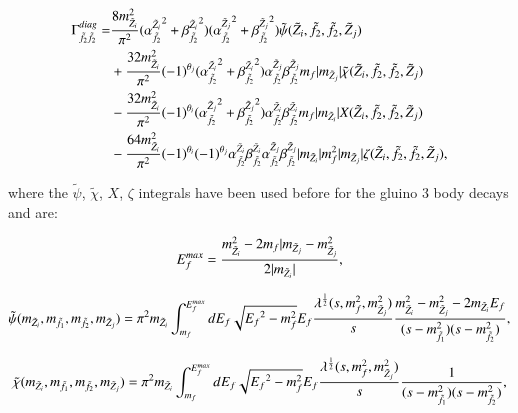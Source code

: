 \documentclass[final,3p,times]{elsarticle}
\begin{document}
\begin{equation}
\begin{aligned}
\Gamma_{\tilde{f}_2 \tilde{f}_2}^{diag} = & {8m_{\tilde{Z}_i}^2 \over \pi^2}({\alpha_{\tilde{f}_2}^{\tilde{Z}_i}}^2 + {\beta_{\tilde{f}_2}^{\tilde{Z}_i}}^2) ({\alpha_{\tilde{f}_2}^{\tilde{Z}_j}}^2 + {\beta_{\tilde{f}_2}^{\tilde{Z}_j}}^2)  \tilde{\psi}(\tilde{Z}_i,\tilde{f}_2,\tilde{f}_2,\tilde{Z}_j) \\ & + {32 m_{\tilde{Z}_i}^2 \over \pi^2}(-1)^{\theta_j} ({\alpha_{\tilde{f}_2}^{\tilde{Z}_i}}^2 + {\beta_{\tilde{f}_2}^{\tilde{Z}_i}}^2) {\alpha_{\tilde{f}_2}^{\tilde{Z}_j}} {\beta_{\tilde{f}_2}^{\tilde{Z}_j}} m_{f} |m_{\tilde{Z}_j}|\tilde{\chi}(\tilde{Z}_i,\tilde{f}_2, \tilde{f}_2, \tilde{Z}_j) \\ & - {32 m_{\tilde{Z}_i}^2 \over \pi^2}(-1)^{\theta_i} ({\alpha_{\tilde{f}_2}^{\tilde{Z}_j}}^2 + {\beta_{\tilde{f}_2}^{\tilde{Z}_j}}^2) {\alpha_{\tilde{f}_2}^{\tilde{Z}_i}} {\beta_{\tilde{f}_2}^{\tilde{Z}_i}} m_f |m_{\tilde{Z}_i}|X(\tilde{Z}_i, \tilde{f}_2, \tilde{f}_2, \tilde{Z}_j) \\ & - {64 m_{\tilde{Z}_i}^2 \over \pi^2}(-1)^{\theta_i}(-1)^{\theta_j} {\alpha_{\tilde{f}_2}^{\tilde{Z}_i}} {\beta_{\tilde{f}_2}^{\tilde{Z}_i}} {\alpha_{\tilde{f}_2}^{\tilde{Z}_j}} {\beta_{\tilde{f}_2}^{\tilde{Z}_j}} |m_{\tilde{Z}_i}|m_{f}^2 |m_{\tilde{Z}_j}| \zeta(\tilde{Z}_i,\tilde{f}_2, \tilde{f}_2, \tilde{Z}_j),
\end{aligned}
\end{equation}

where the $\tilde{\psi}$, $\tilde{\chi}$, $X$, $\zeta$ integrals have been used before for the gluino 3 body decays and are:

\begin{equation}
E^{max}_{f} = {m_{\tilde{Z}_i}^2 - 2m_{f}|m_{\tilde{Z}_j} - m_{\tilde{Z}_j}^2 \over 2|m_{\tilde{Z}_i}|},
\end{equation}


\begin{equation} \label{psiintegral}
\tilde{\psi} (m_{\tilde{Z}_i},m_{\tilde{f}_1},m_{\tilde{f}_2},m_{\tilde{Z}_j}) = \pi^2 m_{\tilde{Z}_i} \int_{m_{f}}^{E^{max}_{f}} dE_f \sqrt{{E_f}^2 - m_{f}^2} E_f {\lambda^{1 \over 2} (s,m_{f}^2, m_{\tilde{Z}_j}^2) \over s} {m_{\tilde{Z}_i}^2 - m_{\tilde{Z}_j}^2 - 2m_{\tilde{Z}_i}E_f \over (s-m_{\tilde{f}_1}^2)(s-m_{\tilde{f}_2}^2)},
\end{equation} 


\begin{equation} \label{chitildaintegral}
\tilde{\chi} (m_{\tilde{Z}_i},m_{\tilde{f}_1},m_{\tilde{f}_2},m_{\tilde{Z}_j}) = \pi^2 m_{\tilde{Z}_i} \int_{m_{f}}^{E^{max}_{f}} dE_f \sqrt{{E_f}^2 - m_{f}^2} E_f {\lambda^{1 \over 2} (s,m_{f}^2, m_{\tilde{Z}_j}^2) \over s} {1 \over (s-m_{\tilde{f}_1}^2)(s-m_{\tilde{f}_2}^2)},
\end{equation}
\end{document}
